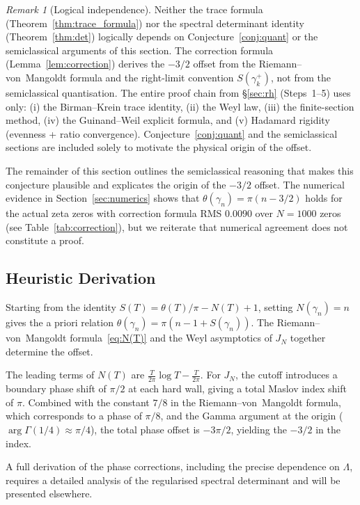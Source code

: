 \documentclass{pre-aomart}
\theoremstyle{plain}
\theoremstyle{definition}
\theoremstyle{remark}
\newtheorem{remark}[theorem]{Remark}
\begin{document}
\begin{remark}[Logical independence]\label{rem:conj_independence}
Neither the trace formula (Theorem~\ref{thm:trace_formula}) nor the spectral determinant identity (Theorem~\ref{thm:det}) logically depends on Conjecture~\ref{conj:quant} or the semiclassical arguments of this section.  The correction formula (Lemma~\ref{lem:correction}) derives the $-3/2$ offset from the Riemann--von~Mangoldt formula and the right-limit convention $S(\gamma_k^+)$, not from the semiclassical quantisation.  The entire proof chain from \S\ref{sec:rh} (Steps~1--5) uses only: (i) the Birman--Krein trace identity, (ii) the Weyl law, (iii) the finite-section method, (iv) the Guinand--Weil explicit formula, and (v) Hadamard rigidity (evenness + ratio convergence).  Conjecture~\ref{conj:quant} and the semiclassical sections are included solely to motivate the physical origin of the offset.
\end{remark}

The remainder of this section outlines the semiclassical reasoning that makes
this conjecture plausible and explicates the origin of the $-3/2$ offset.  The
numerical evidence in Section~\ref{sec:numerics} shows that
$\theta(\gamma_n) = \pi(n - 3/2)$ holds for the actual zeta zeros with
correction formula RMS $0.0090$ over $N=1000$ zeros (see Table~\ref{tab:correction}),
but we reiterate that numerical agreement does not constitute a proof.

\subsection{Heuristic Derivation}

Starting from the identity $S(T) = \theta(T)/\pi - N(T) + 1$, setting $N(\gamma_n) = n$
gives the a priori relation $\theta(\gamma_n) = \pi(n - 1 + S(\gamma_n))$.  The
Riemann--von~Mangoldt formula~\eqref{eq:N(T)} and the Weyl asymptotics of $J_N$
together determine the offset.

The leading terms of $N(T)$ are $\frac{T}{2\pi}\log T - \frac{T}{2\pi}$.
For $J_N$, the cutoff introduces a boundary phase shift of $\pi/2$ at each hard wall,
giving a total Maslov index shift of $\pi$.  Combined with the constant $7/8$ in the
Riemann--von~Mangoldt formula, which corresponds to a phase of $\pi/8$, and the Gamma
argument at the origin ($\arg\Gamma(1/4) \approx \pi/4$), the total phase offset is
$-3\pi/2$, yielding the $-3/2$ in the index.

A full derivation of the phase corrections, including the precise dependence on $\Lambda$,
requires a detailed analysis of the regularised spectral determinant and will be presented
elsewhere.
\end{document}
